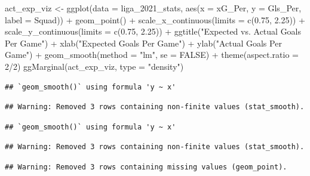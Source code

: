 \documentclass[
  11pt,
]{book}
\newenvironment{Shaded}{\begin{snugshade}}{\end{snugshade}}
\newcommand{\AttributeTok}[1]{\textcolor[rgb]{0.77,0.63,0.00}{#1}}
\newcommand{\ConstantTok}[1]{\textcolor[rgb]{0.00,0.00,0.00}{#1}}
\newcommand{\DecValTok}[1]{\textcolor[rgb]{0.00,0.00,0.81}{#1}}
\newcommand{\FloatTok}[1]{\textcolor[rgb]{0.00,0.00,0.81}{#1}}
\newcommand{\FunctionTok}[1]{\textcolor[rgb]{0.00,0.00,0.00}{#1}}
\newcommand{\NormalTok}[1]{#1}
\newcommand{\OtherTok}[1]{\textcolor[rgb]{0.56,0.35,0.01}{#1}}
\newcommand{\SpecialCharTok}[1]{\textcolor[rgb]{0.00,0.00,0.00}{#1}}
\newcommand{\StringTok}[1]{\textcolor[rgb]{0.31,0.60,0.02}{#1}}
\theoremstyle{definition}
\theoremstyle{definition}
\theoremstyle{definition}
\theoremstyle{definition}
\theoremstyle{remark}
\begin{document}
\begin{Shaded}
\begin{Highlighting}[]
\NormalTok{act\_exp\_viz }\OtherTok{\textless{}{-}} \FunctionTok{ggplot}\NormalTok{(}\AttributeTok{data =}\NormalTok{ liga\_2021\_stats, }\FunctionTok{aes}\NormalTok{(}\AttributeTok{x =}\NormalTok{ xG\_Per, }\AttributeTok{y =}\NormalTok{ Gls\_Per, }\AttributeTok{label =}\NormalTok{ Squad)) }\SpecialCharTok{+}
    \FunctionTok{geom\_point}\NormalTok{() }\SpecialCharTok{+} \FunctionTok{scale\_x\_continuous}\NormalTok{(}\AttributeTok{limits =} \FunctionTok{c}\NormalTok{(}\FloatTok{0.75}\NormalTok{, }\FloatTok{2.25}\NormalTok{)) }\SpecialCharTok{+} \FunctionTok{scale\_y\_continuous}\NormalTok{(}\AttributeTok{limits =} \FunctionTok{c}\NormalTok{(}\FloatTok{0.75}\NormalTok{,}
    \FloatTok{2.25}\NormalTok{)) }\SpecialCharTok{+} \FunctionTok{ggtitle}\NormalTok{(}\StringTok{"Expected vs. Actual Goals Per Game"}\NormalTok{) }\SpecialCharTok{+} \FunctionTok{xlab}\NormalTok{(}\StringTok{"Expected Goals Per Game"}\NormalTok{) }\SpecialCharTok{+}
    \FunctionTok{ylab}\NormalTok{(}\StringTok{"Actual Goals Per Game"}\NormalTok{) }\SpecialCharTok{+} \FunctionTok{geom\_smooth}\NormalTok{(}\AttributeTok{method =} \StringTok{"lm"}\NormalTok{, }\AttributeTok{se =} \ConstantTok{FALSE}\NormalTok{) }\SpecialCharTok{+} \FunctionTok{theme}\NormalTok{(}\AttributeTok{aspect.ratio =} \DecValTok{2}\SpecialCharTok{/}\DecValTok{2}\NormalTok{)}
\FunctionTok{ggMarginal}\NormalTok{(act\_exp\_viz, }\AttributeTok{type =} \StringTok{"density"}\NormalTok{)}
\end{Highlighting}
\end{Shaded}

\begin{verbatim}
## `geom_smooth()` using formula 'y ~ x'
\end{verbatim}

\begin{verbatim}
## Warning: Removed 3 rows containing non-finite values (stat_smooth).
\end{verbatim}

\begin{verbatim}
## `geom_smooth()` using formula 'y ~ x'
\end{verbatim}

\begin{verbatim}
## Warning: Removed 3 rows containing non-finite values (stat_smooth).
\end{verbatim}

\begin{verbatim}
## Warning: Removed 3 rows containing missing values (geom_point).
\end{verbatim}
\end{document}

